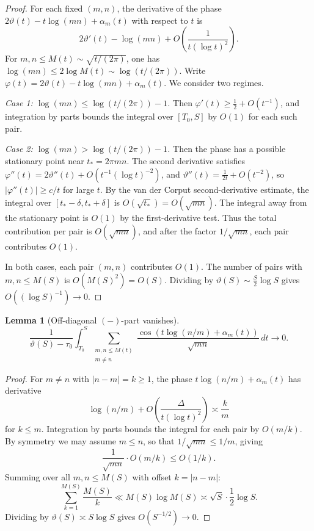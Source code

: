 \documentclass[11pt]{article}
\numberwithin{equation}{section}
\theoremstyle{plain}
\newtheorem{lemma}[theorem]{Lemma}
\theoremstyle{definition}
\begin{document}
\begin{proof}
For each fixed \((m,n)\), the derivative of the phase \(2\vartheta(t)-t\log(mn)+\alpha_m(t)\)
with respect to \(t\) is
\[
2\vartheta'(t)-\log(mn)+O\!\left(\frac{1}{t(\log t)^2}\right).
\]
For \(m,n\le M(t)\sim\sqrt{t/(2\pi)}\), one has \(\log(mn)\le 2\log M(t)\sim\log(t/(2\pi))\).
Write \(\varphi(t)=2\vartheta(t)-t\log(mn)+\alpha_m(t)\). We consider two regimes.

\emph{Case 1: \(\log(mn)\le\log(t/(2\pi))-1\).} Then
\(\varphi'(t)\ge\frac12+O(t^{-1})\), and integration by parts bounds the integral
over \([T_0,S]\) by \(O(1)\) for each such pair.

\emph{Case 2: \(\log(mn)>\log(t/(2\pi))-1\).} Then the phase has a possible
stationary point near \(t_*=2\pi mn\). The second derivative satisfies
\(\varphi''(t)=2\vartheta''(t)+O(t^{-1}(\log t)^{-2})\), and
\(\vartheta''(t)=\frac{1}{2t}+O(t^{-2})\), so \(|\varphi''(t)|\ge c/t\) for
large \(t\). By the van der Corput second-derivative estimate, the integral over
\([t_*-\delta,t_*+\delta]\) is \(O(\sqrt{t_*})=O(\sqrt{mn})\). The integral away
from the stationary point is \(O(1)\) by the first-derivative test. Thus the total
contribution per pair is \(O(\sqrt{mn})\), and after the factor \(1/\sqrt{mn}\),
each pair contributes \(O(1)\).

In both cases, each pair \((m,n)\) contributes \(O(1)\). The number of pairs with
\(m,n\le M(S)\) is \(O(M(S)^2)=O(S)\). Dividing by
\(\vartheta(S)\sim\frac{S}{2}\log S\) gives \(O((\log S)^{-1})\to0\).
\end{proof}

\begin{lemma}[Off-diagonal \((-)\)-part vanishes]
\[
\frac{1}{\vartheta(S)-\tau_0}
\int_{T_0}^S
\sum_{\substack{m,n\le M(t)\\m\neq n}}
\frac{\cos(t\log(n/m)+\alpha_m(t))}{\sqrt{mn}}
\,dt
\to 0.
\]
\end{lemma}

\begin{proof}
For \(m\neq n\) with \(|n-m|=k\ge1\), the phase \(t\log(n/m)+\alpha_m(t)\) has derivative
\[
\log(n/m)+O\!\left(\frac{\Delta}{t(\log t)^2}\right)
\asymp \frac{k}{m}
\]
for \(k\le m\). Integration by parts bounds the integral for each pair by
\(O(m/k)\). By symmetry we may assume \(m\le n\), so that \(1/\sqrt{mn}\le 1/m\), giving
\[
\frac{1}{\sqrt{mn}}\cdot O(m/k)\le O(1/k).
\]
Summing over all \(m,n\le M(S)\) with offset \(k=|n-m|\):
\[
\sum_{k=1}^{M(S)}\frac{M(S)}{k}\ll M(S)\log M(S)\asymp \sqrt{S}\cdot\frac12\log S.
\]
Dividing by \(\vartheta(S)\asymp S\log S\) gives \(O(S^{-1/2})\to0\).
\end{proof}
\end{document}
